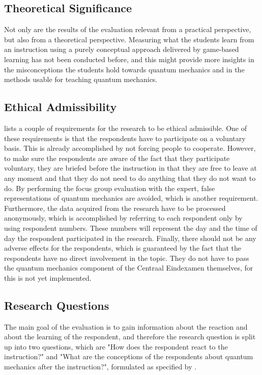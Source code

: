 \documentclass[11pt,twoside]{report} %
\begin{document}
\subsection{Theoretical Significance}

Not only are the results of the evaluation relevant from a practical perspective, but also from a theoretical perspective. Measuring what the students learn from an instruction using a purely conceptual approach delivered by game-based learning has not been conducted before, and this might provide more insights in the misconceptions the students hold towards quantum mechanics and in the methods usable for teaching quantum mechanics.

\subsection{Ethical Admissibility}

 lists a couple of requirements for the research to be ethical admissible. One of these requirements is that the respondents have to participate on a voluntary basis. This is already accomplished by not forcing people to cooperate. However, to make sure the respondents are aware of the fact that they participate voluntary, they are briefed before the instruction in that they are free to leave at any moment and that they do not need to do anything that they do not want to do. By performing the focus group evaluation with the expert, false representations of quantum mechanics are avoided, which is another requirement. Furthermore, the data acquired from the research have to be processed anonymously, which is accomplished by referring to each respondent only by using respondent numbers. These numbers will represent the day and the time of day the respondent participated in the research. Finally, there should not be any adverse effects for the respondents, which is guaranteed by the fact that the respondents have no direct involvement in the topic. They do not have to pass the quantum mechanics component of the Centraal Eindexamen themselves, for this is not yet implemented.

\subsection{Research Questions}

The main goal of the evaluation is to gain information about the reaction and about the learning of the respondent, and therefore the research question is split up into two questions, which are "How does the respondent react to the instruction?" and "What are the conceptions of the respondents about quantum mechanics after the instruction?", formulated as specified by .
\end{document}
